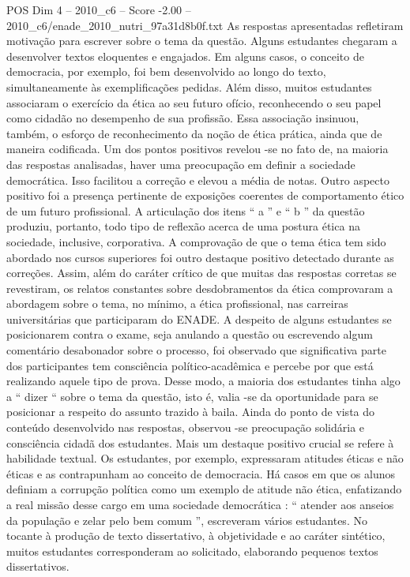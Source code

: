 \begin{textsample}{POS Dim 4 – 2010\_c6 – Score -2.00 – 2010\_c6/enade\_2010\_nutri\_97a31d8b0f.txt}
As respostas apresentadas refletiram motivação para escrever sobre o tema da questão.
Alguns estudantes chegaram a desenvolver textos eloquentes e engajados.
Em alguns casos, o conceito de democracia, por exemplo, foi bem desenvolvido ao longo do texto, simultaneamente às exemplificações pedidas.
Além disso, muitos estudantes associaram o exercício da ética ao seu futuro ofício, reconhecendo o seu papel como cidadão no desempenho de sua profissão.
Essa associação insinuou, também, o esforço de reconhecimento da noção de ética prática, ainda que de maneira codificada.
Um dos pontos positivos revelou -se no fato de, na maioria das respostas analisadas, haver uma preocupação em definir a sociedade democrática.
Isso facilitou a correção e elevou a média de notas.
Outro aspecto positivo foi a presença pertinente de exposições coerentes de comportamento ético de um futuro profissional.
A articulação dos itens “ a ” e “ b ” da questão produziu, portanto, todo tipo de reflexão acerca de uma postura ética na sociedade, inclusive, corporativa.
A comprovação de que o tema ética tem sido abordado nos cursos superiores foi outro destaque positivo detectado durante as correções.
Assim, além do caráter crítico de que muitas das respostas corretas se revestiram, os relatos constantes sobre desdobramentos da ética comprovaram a abordagem sobre o tema, no mínimo, a ética profissional, nas carreiras universitárias que participaram do ENADE.
A despeito de alguns estudantes se posicionarem contra o exame, seja anulando a questão ou escrevendo algum comentário desabonador sobre o processo, foi observado que significativa parte dos participantes tem consciência político-acadêmica e percebe por que está realizando aquele tipo de prova.
Desse modo, a maioria dos estudantes tinha algo a “ dizer “ sobre o tema da questão, isto é, valia -se da oportunidade para se posicionar a respeito do assunto trazido à baila.
Ainda do ponto de vista do conteúdo desenvolvido nas respostas, observou -se preocupação solidária e consciência cidadã dos estudantes.
Mais um destaque positivo crucial se refere à habilidade textual.
Os estudantes, por exemplo, expressaram atitudes éticas e não éticas e as contrapunham ao conceito de democracia.
Há casos em que os alunos definiam a corrupção política como um exemplo de atitude não ética, enfatizando a real missão desse cargo em uma sociedade democrática : “ atender aos anseios da população e zelar pelo bem comum ”, escreveram vários estudantes.
No tocante à produção de texto dissertativo, à objetividade e ao caráter sintético, muitos estudantes corresponderam ao solicitado, elaborando pequenos textos dissertativos.

\end{textsample}
